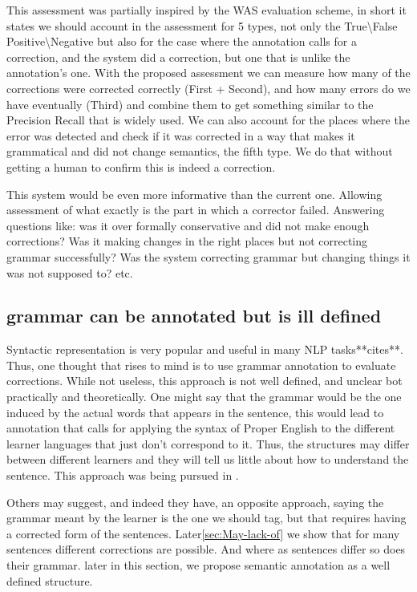 \documentclass[11pt]{article}
\begin{document}
This assessment was partially inspired by the WAS evaluation scheme\cite{chodorow2012problems},
in short it states we should account in the assessment for 5 types,
not only the True\textbackslash{}False Positive\textbackslash{}Negative
but also for the case where the annotation calls for a correction,
and the system did a correction, but one that is unlike the annotation's
one. With the proposed assessment we can measure how many of the corrections
were corrected correctly (First + Second), and how many errors do
we have eventually (Third) and combine them to get something similar
to the Precision Recall that is widely used. We can also account for
the places where the error was detected and check if it was corrected
in a way that makes it grammatical and did not change semantics, the
fifth type. We do that without getting a human to confirm this is
indeed a correction.

This system would be even more informative than the current one. Allowing assessment of
what exactly is the part in which a corrector failed. Answering questions
like: was it over formally conservative and did not make enough corrections?
Was it making changes in the right places but not correcting grammar
successfully? Was the system correcting grammar but changing things
it was not supposed to? etc.

\subsection{grammar can be annotated but is ill defined}

Syntactic representation is very popular and useful in many NLP tasks{*}{*}cites{*}{*}.
Thus, one thought that rises to mind is to use grammar annotation
to evaluate corrections. While not useless, this approach is not well
defined, and unclear bot practically and theoretically. One might
say that the grammar would be the one induced by the actual words
that appears in the sentence, this would lead to annotation that calls
for applying the syntax of Proper English to the different learner
languages that just don't correspond to it. Thus, the structures may
differ between different learners and they will tell us little about
how to understand the sentence. This approach was being pursued in
\cite{berzak2016universal}. 

Others may suggest, and indeed they have\cite{nagataphrase}, an opposite
approach, saying the grammar meant by the learner is the one we should
tag, but that requires having a corrected form of the sentences. Later\ref{sec:May-lack-of}
we show that for many sentences different corrections are possible.
And where as sentences differ so does their grammar. later in this
section, we propose semantic annotation as a well defined structure.
\end{document}
